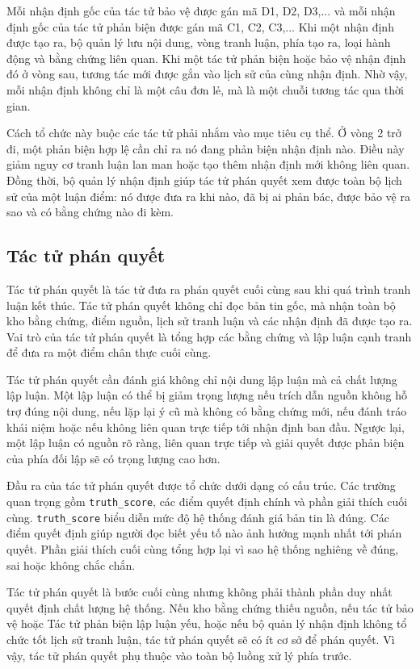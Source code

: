 ﻿\documentclass[oneside,a4paper,12pt]{extreport}
\begin{document}
Mỗi nhận định gốc của tác tử bảo vệ được gán mã D1, D2, D3,... và mỗi nhận định gốc của tác tử phản biện được gán mã C1, C2, C3,... Khi một nhận định được tạo ra, bộ quản lý lưu nội dung, vòng tranh luận, phía tạo ra, loại hành động và bằng chứng liên quan. Khi một tác tử phản biện hoặc bảo vệ nhận định đó ở vòng sau, tương tác mới được gắn vào lịch sử của cùng nhận định. Nhờ vậy, mỗi nhận định không chỉ là một câu đơn lẻ, mà là một chuỗi tương tác qua thời gian.

Cách tổ chức này buộc các tác tử phải nhắm vào mục tiêu cụ thể. Ở vòng 2 trở đi, một phản biện hợp lệ cần chỉ ra nó đang phản biện nhận định nào. Điều này giảm nguy cơ tranh luận lan man hoặc tạo thêm nhận định mới không liên quan. Đồng thời, bộ quản lý nhận định giúp tác tử phán quyết xem được toàn bộ lịch sử của một luận điểm: nó được đưa ra khi nào, đã bị ai phản bác, được bảo vệ ra sao và có bằng chứng nào đi kèm.

\subsection{Tác tử phán quyết}

Tác tử phán quyết là tác tử đưa ra phán quyết cuối cùng sau khi quá trình tranh luận kết thúc. Tác tử phán quyết không chỉ đọc bản tin gốc, mà nhận toàn bộ kho bằng chứng, điểm nguồn, lịch sử tranh luận và các nhận định đã được tạo ra. Vai trò của tác tử phán quyết là tổng hợp các bằng chứng và lập luận cạnh tranh để đưa ra một điểm chân thực cuối cùng.

Tác tử phán quyết cần đánh giá không chỉ nội dung lập luận mà cả chất lượng lập luận. Một lập luận có thể bị giảm trọng lượng nếu trích dẫn nguồn không hỗ trợ đúng nội dung, nếu lặp lại ý cũ mà không có bằng chứng mới, nếu đánh tráo khái niệm hoặc nếu không liên quan trực tiếp tới nhận định ban đầu. Ngược lại, một lập luận có nguồn rõ ràng, liên quan trực tiếp và giải quyết được phản biện của phía đối lập sẽ có trọng lượng cao hơn.

Đầu ra của tác tử phán quyết được tổ chức dưới dạng có cấu trúc. Các trường quan trọng gồm \texttt{truth\_score}, các điểm quyết định chính và phần giải thích cuối cùng. \texttt{truth\_score} biểu diễn mức độ hệ thống đánh giá bản tin là đúng. Các điểm quyết định giúp người đọc biết yếu tố nào ảnh hưởng mạnh nhất tới phán quyết. Phần giải thích cuối cùng tổng hợp lại vì sao hệ thống nghiêng về đúng, sai hoặc không chắc chắn.

Tác tử phán quyết là bước cuối cùng nhưng không phải thành phần duy nhất quyết định chất lượng hệ thống. Nếu kho bằng chứng thiếu nguồn, nếu tác tử bảo vệ hoặc Tác tử phản biện lập luận yếu, hoặc nếu bộ quản lý nhận định không tổ chức tốt lịch sử tranh luận, tác tử phán quyết sẽ có ít cơ sở để phán quyết. Vì vậy, tác tử phán quyết phụ thuộc vào toàn bộ luồng xử lý phía trước.
\end{document}
